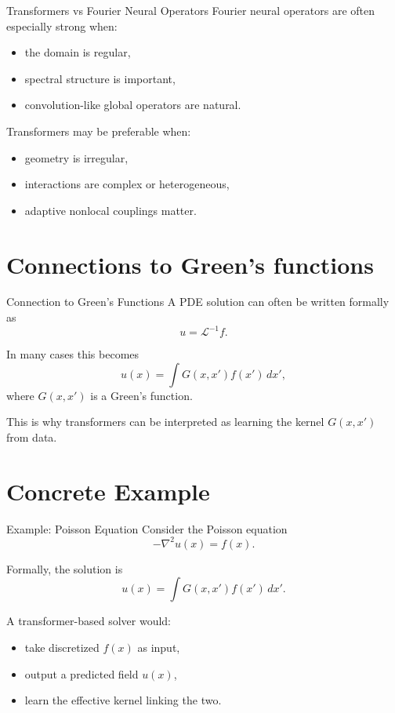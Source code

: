\documentclass{beamer}
\begin{document}

\begin{frame}{Transformers vs Fourier Neural Operators}
Fourier neural operators are often especially strong when:
\begin{itemize}
\item the domain is regular,
\item spectral structure is important,
\item convolution-like global operators are natural.
\end{itemize}

Transformers may be preferable when:
\begin{itemize}
\item geometry is irregular,
\item interactions are complex or heterogeneous,
\item adaptive nonlocal couplings matter.
\end{itemize}
\end{frame}

\section{Connections to Green's functions}

\begin{frame}{Connection to Green's Functions}
A PDE solution can often be written formally as
\[
u = \mathcal{L}^{-1} f.
\]

In many cases this becomes
\[
u(x) = \int G(x,x') f(x')\, dx',
\]
where \(G(x,x')\) is a Green's function.

\medskip

This is why transformers can be interpreted as learning the kernel \(G(x,x')\) from data.
\end{frame}

\section{Concrete Example}

\begin{frame}{Example: Poisson Equation}
Consider the Poisson equation
\[
-\nabla^2 u(x) = f(x).
\]

Formally, the solution is
\[
u(x) = \int G(x,x') f(x')\, dx'.
\]

A transformer-based solver would:
\begin{itemize}
\item take discretized \(f(x)\) as input,
\item output a predicted field \(u(x)\),
\item learn the effective kernel linking the two.
\end{itemize}
\end{frame}
\end{document}
